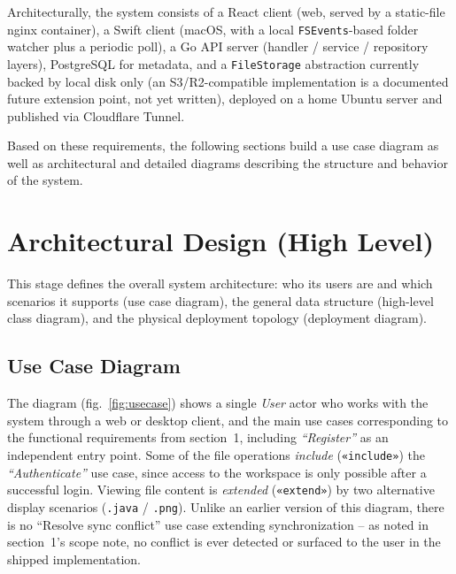 \documentclass[12pt,a4paper]{article}
\begin{document}
Architecturally, the system consists of a React client (web, served by a static-file nginx container), a Swift client (macOS, with a local \texttt{FSEvents}-based folder watcher plus a periodic poll), a Go API server (handler / service / repository layers), PostgreSQL for metadata, and a \texttt{FileStorage} abstraction currently backed by local disk only (an S3/R2-compatible implementation is a documented future extension point, not yet written), deployed on a home Ubuntu server and published via Cloudflare Tunnel.

Based on these requirements, the following sections build a use case diagram as well as architectural and detailed diagrams describing the structure and behavior of the system.

\section{Architectural Design (High Level)}

This stage defines the overall system architecture: who its users are and which scenarios it supports (use case diagram), the general data structure (high-level class diagram), and the physical deployment topology (deployment diagram).

\subsection{Use Case Diagram}

The diagram (fig.~\ref{fig:usecase}) shows a single \emph{User} actor who works with the system through a web or desktop client, and the main use cases corresponding to the functional requirements from section~1, including \emph{``Register''} as an independent entry point. Some of the file operations \emph{include} (\texttt{«include»}) the \emph{``Authenticate''} use case, since access to the workspace is only possible after a successful login. Viewing file content is \emph{extended} (\texttt{«extend»}) by two alternative display scenarios (\texttt{.java} / \texttt{.png}). Unlike an earlier version of this diagram, there is no ``Resolve sync conflict'' use case extending synchronization -- as noted in section~1's scope note, no conflict is ever detected or surfaced to the user in the shipped implementation.
\end{document}
